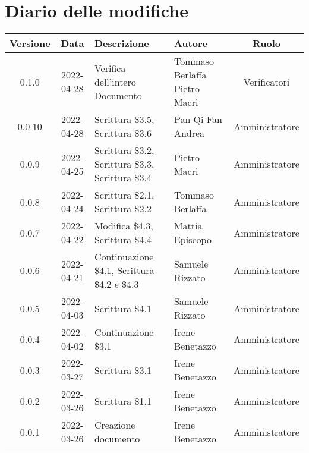 \section*{Diario delle modifiche}
	\begin{center}
	\renewcommand{\arraystretch}{1.8} %
	\begin{tabular}{ |c|c|m{12em}|m{7em}|c| }
	\hline
	\textbf{Versione} & \textbf{Data} & \textbf{Descrizione} &  \textbf{Autore} &  \textbf{Ruolo} \\ %
	\hline
	0.1.0 & 2022-04-28 & Verifica dell'intero Documento & Tommaso Berlaffa \newline Pietro Macrì & Verificatori\\
	\hline
	0.0.10 & 2022-04-28 & Scrittura \$3.5, Scrittura \$3.6 & Pan Qi Fan \newline Andrea & Amministratore\\
	\hline
	0.0.9 & 2022-04-25 & Scrittura \$3.2, Scrittura \$3.3, Scrittura \$3.4 & Pietro Macrì & Amministratore\\
	\hline
	0.0.8 & 2022-04-24 & Scrittura \$2.1, Scrittura \$2.2 & Tommaso \newline Berlaffa & Amministratore\\
	\hline
	0.0.7 & 2022-04-22 & Modifica \$4.3, Scrittura \$4.4 & Mattia \newline Episcopo & Amministratore\\
	\hline
	0.0.6 & 2022-04-21 & Continuazione \$4.1, Scrittura \$4.2 e \$4.3 & Samuele \newline Rizzato & Amministratore\\ %
	\hline
	0.0.5 & 2022-04-03 & Scrittura \$4.1 & Samuele \newline Rizzato & Amministratore\\
	\hline
	0.0.4 & 2022-04-02 & Continuazione \$3.1 & Irene Benetazzo & Amministratore\\
	\hline
	0.0.3 & 2022-03-27 & Scrittura \$3.1 & Irene Benetazzo & Amministratore\\
	\hline
	0.0.2 & 2022-03-26 & Scrittura \$1.1 & Irene Benetazzo & Amministratore\\
	\hline
    0.0.1 & 2022-03-26 & Creazione documento & Irene Benetazzo & Amministratore\\
	\hline
	\end{tabular}
	\end{center}
	\newpage